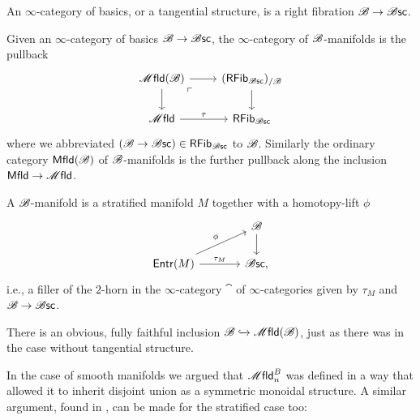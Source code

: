\documentclass[../text]{subfiles}
\begin{document}
\begin{definition}
    An $\infty$-category of basics, or a tangential structure, is a right fibration $\mathscr{B} \rightarrow \mathscr{B} \mathsf{sc}$.
\end{definition}

\begin{definition}
    Given an $\infty$-category of basics $\mathscr{B} \rightarrow \mathscr{B} \mathsf{sc}$, the $\infty$-category of $\mathscr{B}$-manifolds is the pullback
    \begin{equation}
        \begin{tikzcd}
            \mfld(\bstr) \arrow[dr, phantom, "\ulcorner", very near start] \arrow[r] \arrow[d] & (\mathsf{RFib}_{\bsc})_{/\bstr} \arrow[d] \\
            \mfld \arrow[r, "\tau"] & \mathsf{RFib}_{\bsc}
        \end{tikzcd}
    \end{equation}
    where we abbreviated $(\mathscr{B}\to\mathscr{B} \mathsf{sc})\in\mathsf{RFib}_{\mathscr{B} \mathsf{sc}}$ to $\mathscr{B}$. Similarly the ordinary category $\mfld[r](\bstr)$ of $\mathscr{B}$-manifolds is the further pullback along the inclusion $\mfld[r]\to\mfld$.
\end{definition}

\begin{remark}
    A $\mathscr{B}$-manifold is a stratified manifold $M$ together with a homotopy-lift $\phi$
    \begin{equation}
        \begin{tikzcd}[column sep = large]
            & \bstr \arrow[d] \\
            \mathsf{Entr}(M) \arrow[ru, "\phi"] \arrow[r, "\tau_M"] & \bsc,
        \end{tikzcd}
    \end{equation}
    i.e., a filler of the $2$-horn in the $\infty$-category $\cat$ of $\infty$-categories  given by $\tau_M$ and $\mathscr{B}\to\mathscr{B} \mathsf{sc}$.
\end{remark}

\begin{remark}
    There is an obvious, fully faithful inclusion $\bstr \xhookrightarrow{} \mfld(\bstr)$, just as there was in the case without tangential structure.
\end{remark}

In the case of smooth manifolds we argued that $\mfld_n^B$ was defined in a way that allowed it to inherit disjoint union as a symmetric monoidal structure. A similar argument, found in \cite{aft_fhstrat}, can be made for the stratified case too: 
\end{document}
